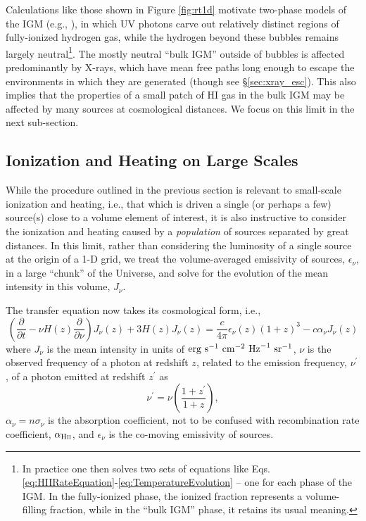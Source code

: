 Calculations like those shown in Figure \ref{fig:rt1d} motivate two-phase models of the IGM (e.g., \cite{Furlanetto2006,Pritchard2010,Mirocha2015}), in which UV photons carve out relatively distinct regions of fully-ionized hydrogen gas, while the hydrogen beyond these bubbles remains largely neutral\footnote{In practice one then solves two sets of equations like Eqs. \ref{eq:HIIRateEquation}-\ref{eq:TemperatureEvolution} -- one for each phase of the IGM. In the fully-ionized phase, the ionized fraction represents a volume-filling fraction, while in the ``bulk IGM'' phase, it retains its usual meaning.}. The mostly neutral ``bulk IGM'' outside of bubbles is affected predominantly by X-rays, which have mean free paths long enough to escape the environments in which they are generated (though see \S\ref{sec:xray_esc}). This also implies that the properties of a small patch of HI gas in the bulk IGM may be affected by many sources at cosmological distances. We focus on this limit in the next sub-section. 


\subsection{Ionization and Heating on Large Scales} \label{sec:largescales}
While the procedure outlined in the previous section is relevant to small-scale ionization and heating, i.e., that which is driven a single (or perhaps a few) source(s) close to a volume element of interest, it is also instructive to consider the ionization and heating caused by a \textit{population} of sources separated by great distances. In this limit, rather than considering the luminosity of a single source at the origin of a 1-D grid, we treat the volume-averaged emissivity of sources, $\epsilon_{\nu}$, in a large ``chunk'' of the Universe, and solve for the evolution of the mean intensity in this volume, $J_{\nu}$.

The transfer equation now takes its cosmological form, i.e., 
\begin{equation}
    \left(\frac{\partial}{\partial t} - \nu H(z) \frac{\partial}{\partial \nu} \right) J_{\nu}(z) + 3 H(z) J_{\nu}(z) =  \frac{c}{4\pi} \epsilon_{\nu}(z) (1 + z)^3 - c \alpha_{\nu} J_{\nu}(z) \label{eq:rte_diffeq}
\end{equation}
where $J_{\nu}$ is the mean intensity in units of $\text{erg} \ \text{s}^{-1} \ \text{cm}^{-2} \ \mathrm{Hz}^{-1} \ \text{sr}^{-1}$, $\nu$ is the observed frequency of a photon at redshift $z$, related to the emission frequency, $\nu^{\prime}$, of a photon emitted at redshift $z^{\prime}$ as
\begin{equation}
    \nu^{\prime} = \nu \left(\frac{1 + z^{\prime}}{1 + z}\right) , \label{eq:EmissionFrequency}
\end{equation}
$\alpha_{\nu} = n \sigma_{\nu}$ is the absorption coefficient, not to be confused with recombination rate coefficient, $\alpha_{\text{H} {\textsc{ii}}}$, and $\epsilon_{\nu}$ is the co-moving emissivity of sources.

